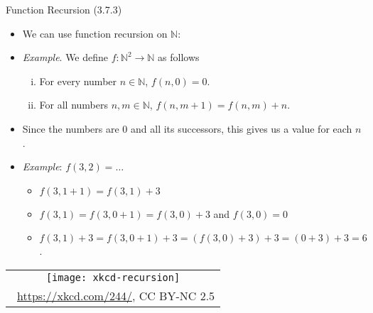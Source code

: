 \begin{frame}{Function Recursion (3.7.3)}

	\begin{itemize}
	
		\item We can use function recursion on $\mathbb{N}$:
		
		\item \emph{Example}. We define $f:\mathbb{N}^2\to\mathbb{N}$ as follows
	\begin{enumerate}[(i)]
	
		\item For every number $n\in\mathbb{N}$, $f(n, 0)=0$.
		
		\item For all numbers $n,m\in\mathbb{N}$, $f(n,m+1)=f(n,m)+n$.
	
	\end{enumerate}
	
	\item Since the numbers are $0$ and all its successors, this gives us a value for each $n$.
	
	\item \emph{Example}: $f(3,2)=\dots$
	
	\begin{itemize}
		
		\item $f(3,1+1)=f(3, 1)+3$
		
		\item $f(3,1)=f(3,0+1)=f(3,0)+3$ and $f(3, 0)=0$
			
		\item $f(3,1)+3=f(3,0+1)+3=(f(3, 0)+3)+3=(0+3)+3=6$.
	
	\end{itemize}

		
	\end{itemize}
	
	\begin{center}
		\begin{tabular}{c}
		\texttt{[image: xkcd-recursion]}\\[-1ex]
		{\tiny \textcopyright~\url{https://xkcd.com/244/}, CC BY-NC 2.5}
		\end{tabular}
		\end{center}

\end{frame}

